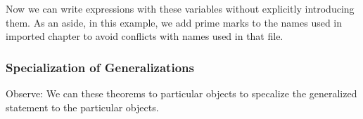 \documentclass[letterpaper,10pt,english]{sphinxmanual}
\begin{document}
\begin{sphinxVerbatim}[commandchars=\\\{\}]
 

          
\end{sphinxVerbatim}

\sphinxAtStartPar
Now we can write expressions with these variables
without explicitly introducing them. As an aside, in
this example, we add prime marks to the names used in
imported chapter to avoid conflicts with names used in
that file.

\begin{sphinxVerbatim}[commandchars=\\\{\}]
           
            
\end{sphinxVerbatim}


\subsubsection{Specialization of Generalizations}
\label{\detokenize{A_01_Propositional_Logic:specialization-of-generalizations}}
\sphinxAtStartPar
Observe: We can  these theorems
to particular objects to specalize the
generalized statement to the particular
objects.

\begin{sphinxVerbatim}[commandchars=\\\{\}]
    
\end{sphinxVerbatim}
\end{document}
